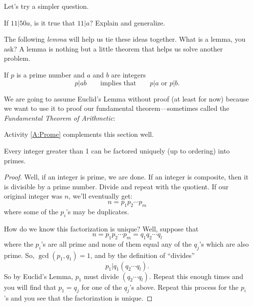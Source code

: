 Let's try a simpler question. 

\begin{question} If $11 | 50a$, is it true that $11|a$?  Explain and generalize.  
\end{question}
\QM


The following \textit{lemma} will help us tie these 
ideas together.  What is a lemma, you
ask? A lemma is nothing but a little theorem that helps us solve
another problem.


\begin{lemma} 
If $p$ is a prime number and $a$ and $b$ are integers
\[
p|ab \qquad\text{implies that} \qquad p | a\text{ or } p|b.
\]
\end{lemma}

We are going to assume Euclid's Lemma without proof (at least for now) because we want to use 
it to proof our fundamental theorem---sometimes called the \textit{Fundamental Theorem of Arithmetic}:

\begin{activitynote}
Activity \ref{A:Prome} complements this section well.  %
\end{activitynote}

\begin{theorem}
Every integer greater than 1 can be factored uniquely (up to ordering)
into primes.
\end{theorem}

\begin{proof}
Well, if an integer is prime, we are done. If an integer is composite,
then it is divisible by a prime number. Divide and repeat with the
quotient. If our original integer was $n$, we'll eventually get:
\[
n = p_1p_2 \cdots p_m
\]
where some of the $p_i$'s may be duplicates. 

How do we know this factorization is unique? Well, suppose that
\[
n = p_1p_2 \cdots p_m = q_1q_2\cdots q_l
\]
where the $p_i$'s are all prime and none of them equal any of the
$q_j$'s which are also prime. So, $\gcd(p_1,q_1) = 1$, and by the
definition of ``divides''
\[
p_1 |q_1(q_2\cdots q_l).
\]
So by Euclid's Lemma, $p_1$ must divide $(q_2\cdots q_l)$. Repeat this
enough times and you will find that $p_1 = q_j$ for one of the $q_j$'s
above. Repeat this process for the $p_i$'s and you see that the
factorization is unique.
\end{proof}

